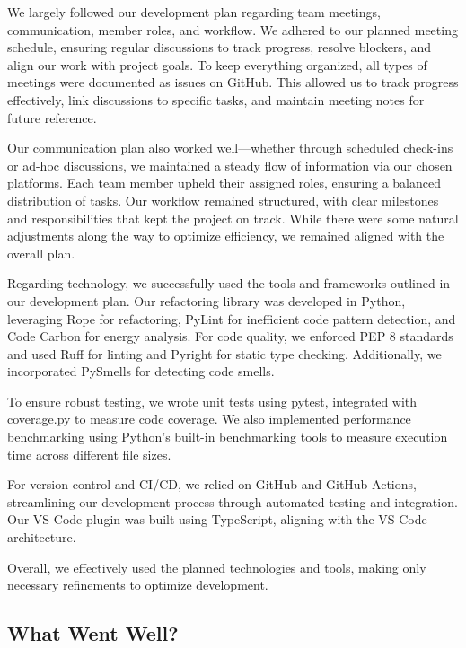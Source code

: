 \documentclass{article}
\begin{document}
We largely followed our development plan regarding team meetings, communication, 
member roles, and workflow. We adhered to our planned meeting schedule, ensuring regular 
discussions to track progress, resolve blockers, and align our work with project goals. 
To keep everything organized, all types of meetings were documented as issues on GitHub. 
This allowed us to track progress effectively, link discussions to specific tasks, and 
maintain meeting notes for future reference.

Our communication plan also worked well—whether through scheduled check-ins or ad-hoc 
discussions, we maintained a steady flow of information via our chosen platforms. Each 
team member upheld their assigned roles, ensuring a balanced distribution of tasks. Our 
workflow remained structured, with clear milestones and responsibilities that kept the 
project on track. While there were some natural adjustments along the way to optimize 
efficiency, we remained aligned with the overall plan.

Regarding technology, we successfully used the tools and frameworks outlined in our 
development plan. Our refactoring library was developed in Python, leveraging Rope for 
refactoring, PyLint for inefficient code pattern detection, and Code Carbon for energy 
analysis. For code quality, we enforced PEP 8 standards and used Ruff for linting and 
Pyright for static type checking. Additionally, we incorporated PySmells for detecting 
code smells.

To ensure robust testing, we wrote unit tests using pytest, integrated with coverage.py 
to measure code coverage. We also implemented performance benchmarking using Python’s 
built-in benchmarking tools to measure execution time across different file sizes.

For version control and CI/CD, we relied on GitHub and GitHub Actions, streamlining 
our development process through automated testing and integration. Our VS Code plugin 
was built using TypeScript, aligning with the VS Code architecture.

Overall, we effectively used the planned technologies and tools, making only necessary 
refinements to optimize development.

\subsection{What Went Well?}

\end{document}
